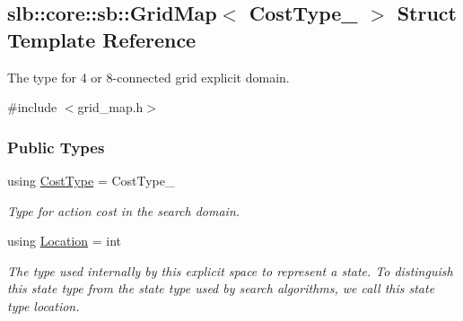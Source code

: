\hypertarget{structslb_1_1core_1_1sb_1_1GridMap}{}\subsection{slb\+:\+:core\+:\+:sb\+:\+:Grid\+Map$<$ Cost\+Type\+\_\+ $>$ Struct Template Reference}
\label{structslb_1_1core_1_1sb_1_1GridMap}


The type for 4 or 8-\/connected grid explicit domain.  




{\ttfamily \#include $<$grid\+\_\+map.\+h$>$}

\subsubsection*{Public Types}
\begin{DoxyCompactItemize}
\item 
using \hyperlink{structslb_1_1core_1_1sb_1_1GridMap_a7e34c6c6b867bb15e2062f5c9ae3458c}{Cost\+Type} = Cost\+Type\+\_\+\hypertarget{structslb_1_1core_1_1sb_1_1GridMap_a7e34c6c6b867bb15e2062f5c9ae3458c}{}\label{structslb_1_1core_1_1sb_1_1GridMap_a7e34c6c6b867bb15e2062f5c9ae3458c}

\begin{DoxyCompactList}\small\item\em Type for action cost in the search domain. \end{DoxyCompactList}\item 
using \hyperlink{structslb_1_1core_1_1sb_1_1GridMap_ad7f78dfb03ac219e9f9047c17996d9f5}{Location} = int\hypertarget{structslb_1_1core_1_1sb_1_1GridMap_ad7f78dfb03ac219e9f9047c17996d9f5}{}\label{structslb_1_1core_1_1sb_1_1GridMap_ad7f78dfb03ac219e9f9047c17996d9f5}

\begin{DoxyCompactList}\small\item\em The type used internally by this explicit space to represent a state. To distinguish this state type from the state type used by search algorithms, we call this state type {\ttfamily location}. \end{DoxyCompactList}\end{DoxyCompactItemize}
